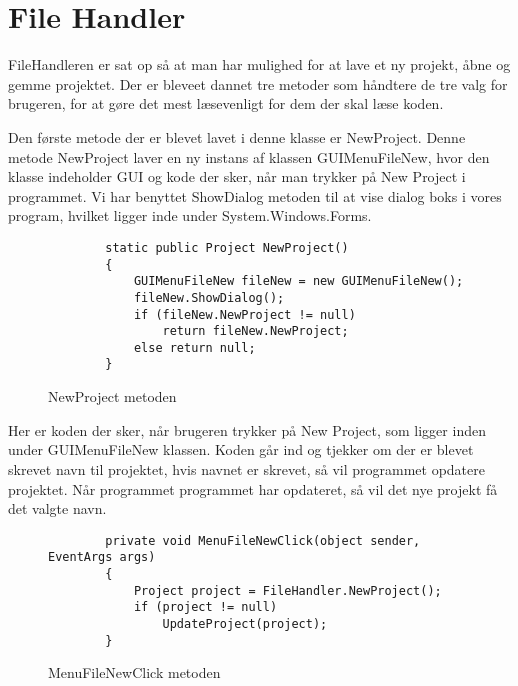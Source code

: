 \chapter{File Handler}\label{FileHandler}

FileHandleren er sat op så at man har mulighed for at lave et ny projekt, åbne og gemme projektet. Der er bleveet dannet tre metoder som håndtere de tre valg for brugeren, for at gøre det mest læsevenligt for dem der skal læse koden.   

\vspace{5mm}

Den første metode der er blevet lavet i denne klasse er NewProject. Denne metode NewProject laver en ny instans af klassen GUIMenuFileNew, hvor den klasse indeholder GUI og kode der sker, når man trykker på New Project i programmet. Vi har benyttet ShowDialog metoden til at vise dialog boks i vores program, hvilket ligger inde under System.Windows.Forms.

\begin{figure}[H]
\begin{lstlisting}
 		static public Project NewProject()
        {
            GUIMenuFileNew fileNew = new GUIMenuFileNew();
            fileNew.ShowDialog();
            if (fileNew.NewProject != null)
                return fileNew.NewProject;
            else return null;
        }
\end{lstlisting}
\caption{NewProject metoden}\label{NewProjectCode}
\end{figure}

\vspace{5mm}

Her er koden der sker, når brugeren trykker på New Project, som ligger inden under GUIMenuFileNew klassen. Koden går ind og tjekker om der er blevet skrevet navn til projektet, hvis navnet er skrevet, så vil programmet opdatere projektet. Når programmet programmet har opdateret, så vil det nye projekt få det valgte navn.

\begin{figure}[H]
\begin{lstlisting}
        private void MenuFileNewClick(object sender, EventArgs args)
        {
            Project project = FileHandler.NewProject();
            if (project != null)
                UpdateProject(project);
        }
\end{lstlisting}
\caption{MenuFileNewClick metoden}\label{MenuFileNewClickCode}
\end{figure}

